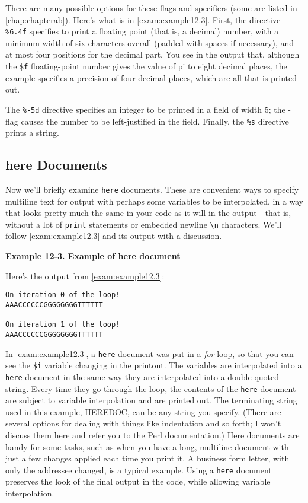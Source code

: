 There are many possible options for these flags and specifiers (some are listed in \autoref{chap:chapterab}). Here's what is in \autoref{exam:example12.3}. First, the directive \verb|%6.4f| specifies to print a floating point (that is, a decimal) number, with a minimum width of six characters overall (padded with spaces if necessary), and at most four positions for the decimal part.  You see in the output that, although the \verb|$f| floating-point number gives the value of pi to eight decimal places, the example specifies a precision of four decimal places, which are all that is printed out.  

The \verb|%-5d| directive specifies an integer to be printed in a field of width 5; the - flag causes the number to be left-justified in the field.  Finally, the \verb|%s| directive prints a string.  

\subsection{here Documents}
Now we'll briefly examine \verb|here| documents. These are convenient ways to specify multiline text for output with perhaps some variables to be interpolated, in a way that looks pretty much the same in your code as it will in the output—that is, without a lot of \verb|print| statements or embedded newline \verb|\n| characters. We'll follow \autoref{exam:example12.3} and its output with a discussion. 

\textbf{Example 12-3. Example of here document}


Here's the output from \autoref{exam:example12.3}:

\begin{lstlisting}
On iteration 0 of the loop!
AAACCCCCCGGGGGGGGTTTTTT

On iteration 1 of the loop!
AAACCCCCCGGGGGGGGTTTTTT
\end{lstlisting}

In \autoref{exam:example12.3}, a \verb|here| document was put in a \textit{for} loop, so that you can see the \verb|$i| variable changing in the printout. The variables are interpolated into a \verb|here| document in the same way they are interpolated into a double-quoted string. Every time they go through the loop, the contents of the \verb|here| document are subject to variable interpolation and are printed out. The terminating string used in this example, HEREDOC, can be any string you specify. (There are several options for dealing with things like indentation and so forth; I won't discuss them here and refer you to the Perl documentation.) Here documents are handy for some tasks, such as when you have a long, multiline document with just a few changes applied each time you print it. A business form letter, with only the addressee changed, is a typical example. Using a \verb|here| document preserves the look of the final output in the code, while allowing variable interpolation.

